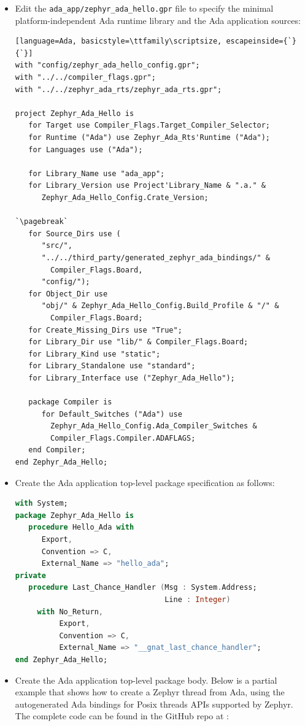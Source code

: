 \documentclass{AUJarticle}
\begin{document}
\begin{itemize}
\item Edit the \verb`ada_app/zephyr_ada_hello.gpr` file to specify the
minimal platform-independent Ada runtime library and the Ada application
sources:

\begin{lstlisting}[language=Ada, basicstyle=\ttfamily\scriptsize, escapeinside={`}{`}]
with "config/zephyr_ada_hello_config.gpr";
with "../../compiler_flags.gpr";
with "../../zephyr_ada_rts/zephyr_ada_rts.gpr";

project Zephyr_Ada_Hello is
   for Target use Compiler_Flags.Target_Compiler_Selector;
   for Runtime ("Ada") use Zephyr_Ada_Rts'Runtime ("Ada");
   for Languages use ("Ada");

   for Library_Name use "ada_app";
   for Library_Version use Project'Library_Name & ".a." &
      Zephyr_Ada_Hello_Config.Crate_Version;

`\pagebreak`
   for Source_Dirs use (
      "src/",
      "../../third_party/generated_zephyr_ada_bindings/" &
        Compiler_Flags.Board,
      "config/");
   for Object_Dir use
      "obj/" & Zephyr_Ada_Hello_Config.Build_Profile & "/" &
        Compiler_Flags.Board;
   for Create_Missing_Dirs use "True";
   for Library_Dir use "lib/" & Compiler_Flags.Board;
   for Library_Kind use "static";
   for Library_Standalone use "standard";
   for Library_Interface use ("Zephyr_Ada_Hello");

   package Compiler is
      for Default_Switches ("Ada") use
        Zephyr_Ada_Hello_Config.Ada_Compiler_Switches &
        Compiler_Flags.Compiler.ADAFLAGS;
   end Compiler;
end Zephyr_Ada_Hello;
\end{lstlisting}

\item Create the Ada application top-level package specification as follows:
\begin{lstlisting}[language=Ada, basicstyle=\ttfamily\scriptsize]
with System;
package Zephyr_Ada_Hello is
   procedure Hello_Ada with
      Export,
      Convention => C,
      External_Name => "hello_ada";
private
   procedure Last_Chance_Handler (Msg : System.Address;
                                  Line : Integer)
     with No_Return,
          Export,
          Convention => C,
          External_Name => "__gnat_last_chance_handler";
end Zephyr_Ada_Hello;
\end{lstlisting}

\item Create the Ada application top-level package body. Below
is a partial example that shows how to create a Zephyr thread
from Ada, using the autogenerated Ada bindings for Posix threads
APIs supported by Zephyr. The complete code can be found in the
GitHub repo at \cite{ZephyrAda}:


\end{itemize}
\end{document}
